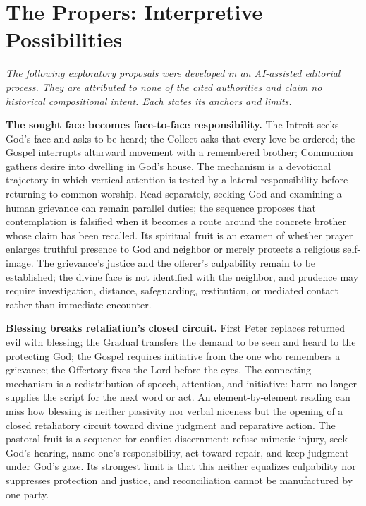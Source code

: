 \sectionguard
\section*{The Propers: Interpretive Possibilities}

\noindent\emph{The following exploratory proposals were developed in an AI-assisted editorial process. They are attributed to none of the cited authorities and claim no historical compositional intent. Each states its anchors and limits.}

\noindent\textbf{The sought face becomes face-to-face responsibility.\enspace{}}
The Introit seeks God's face and asks to be heard; the Collect asks that every love be ordered; the Gospel interrupts altarward movement with a remembered brother; Communion gathers desire into dwelling in God's house. The mechanism is a devotional trajectory in which vertical attention is tested by a lateral responsibility before returning to common worship. Read separately, seeking God and examining a human grievance can remain parallel duties; the sequence proposes that contemplation is falsified when it becomes a route around the concrete brother whose claim has been recalled. Its spiritual fruit is an examen of whether prayer enlarges truthful presence to God and neighbor or merely protects a religious self-image. The grievance's justice and the offerer's culpability remain to be established; the divine face is not identified with the neighbor, and prudence may require investigation, distance, safeguarding, restitution, or mediated contact rather than immediate encounter.

\noindent\textbf{Blessing breaks retaliation's closed circuit.\enspace{}}
First Peter replaces returned evil with blessing; the Gradual transfers the demand to be seen and heard to the protecting God; the Gospel requires initiative from the one who remembers a grievance; the Offertory fixes the Lord before the eyes. The connecting mechanism is a redistribution of speech, attention, and initiative: harm no longer supplies the script for the next word or act. An element-by-element reading can miss how blessing is neither passivity nor verbal niceness but the opening of a closed retaliatory circuit toward divine judgment and reparative action. The pastoral fruit is a sequence for conflict discernment: refuse mimetic injury, seek God's hearing, name one's responsibility, act toward repair, and keep judgment under God's gaze. Its strongest limit is that this neither equalizes culpability nor suppresses protection and justice, and reconciliation cannot be manufactured by one party.

